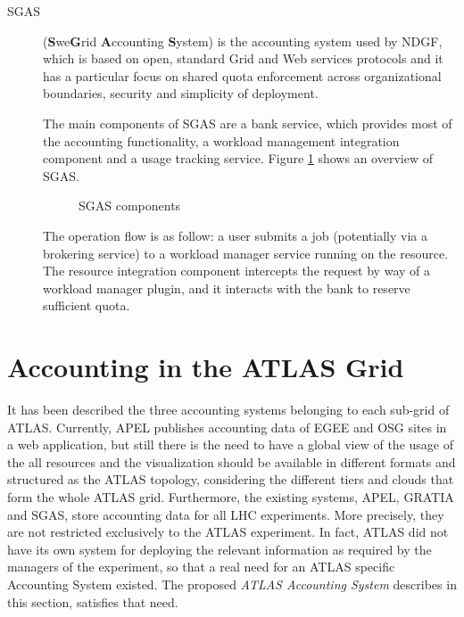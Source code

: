 \begin{description}
\item
[SGAS] \cite{SGAS} (\textbf{S}we\textbf{G}rid \textbf{A}ccounting
\textbf{S}ystem) is the accounting system used by NDGF, which is based
on open, standard Grid and Web services protocols and it has a
particular focus on shared quota enforcement across organizational
boundaries, security and simplicity of deployment.

The main components of SGAS are a bank service, which provides most of
the accounting functionality, a workload management integration
component and a usage tracking service. Figure \ref{fig:sgas} shows an
overview of SGAS.

\begin{figure}[h!tbp]
\centering
{}
\caption{SGAS components}
\label{fig:sgas}
\end{figure}

The operation flow is as follow: a user submits a job (potentially via
a brokering service) to a workload manager service running on the
resource. The resource integration component intercepts the request by
way of a workload manager plugin, and it interacts with the bank to
reserve sufficient quota.
\end{description}





\section{Accounting in the ATLAS Grid}

It has been described the three accounting systems belonging to each
sub-grid of ATLAS.
Currently, APEL publishes accounting data of EGEE and OSG sites in a
web application, but still there is the need to have a global view of
the usage of the all resources and the visualization should be
available in different formats and structured as the ATLAS topology,
considering the different tiers and clouds that form the whole ATLAS
grid. 
Furthermore, the existing systems, APEL, GRATIA and SGAS, store
accounting data for all LHC experiments. 
More precisely, they are not restricted exclusively to the ATLAS
experiment.  
In fact, ATLAS did not have its own system for deploying the relevant
information as required by the managers of the experiment, so that a
real need for an ATLAS specific Accounting System existed. 
The proposed {\itshape ATLAS Accounting System} describes in this
section, satisfies that need.

